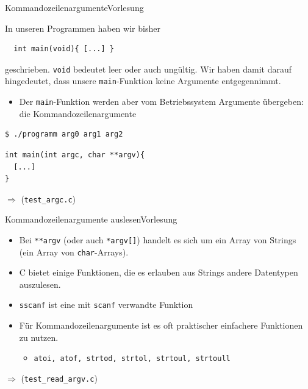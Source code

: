 \documentclass[xcolor=dvipsnames]{beamer}
\newcounter{lecturecounter}
\begin{document}
\begin{frame}[fragile]{Kommandozeilenargumente}{Vorlesung }
\begin{block}{}
  In unseren Programmen haben wir bisher
\end{block}
\begin{lstlisting}
  int main(void){ [...] } 
\end{lstlisting}
\begin{block}{}
  geschrieben. \texttt{void} bedeutet leer oder auch ungültig. Wir haben damit darauf hingedeutet, dass unsere \texttt{main}-Funktion keine Argumente entgegennimmt.
  \begin{itemize}
    \item{Der \texttt{main}-Funktion werden aber vom Betriebssystem Argumente übergeben: die Kommandozeilenargumente}
  \end{itemize}
\begin{verbatim}
$ ./programm arg0 arg1 arg2
\end{verbatim}
\begin{lstlisting}
int main(int argc, char **argv){
  [...]
}
\end{lstlisting}

\end{block}
$\Rightarrow$ (\texttt{test\_argc.c})
\end{frame}

\begin{frame}[fragile]{Kommandozeilenargumente auslesen}{Vorlesung }
  \begin{block}{}
    \begin{itemize}
      \item{Bei \texttt{**argv} (oder auch \texttt{*argv[]}) handelt es sich um ein Array von Strings (ein Array von \texttt{char}-Arrays).}
      \item{C bietet einige Funktionen, die es erlauben aus Strings andere Datentypen auszulesen.}
      \item{\texttt{sscanf} ist eine mit \texttt{scanf} verwandte Funktion}
      \item{Für Kommandozeilenargumente ist es oft praktischer einfachere Funktionen zu nutzen.}
      \begin{itemize}
        \item{\verb|atoi, atof, strtod, strtol, strtoul, strtoull|}
      \end{itemize}
    \end{itemize}
  \end{block}
  $\Rightarrow$ (\texttt{test\_read\_argv.c})
\end{frame}
\end{document}
